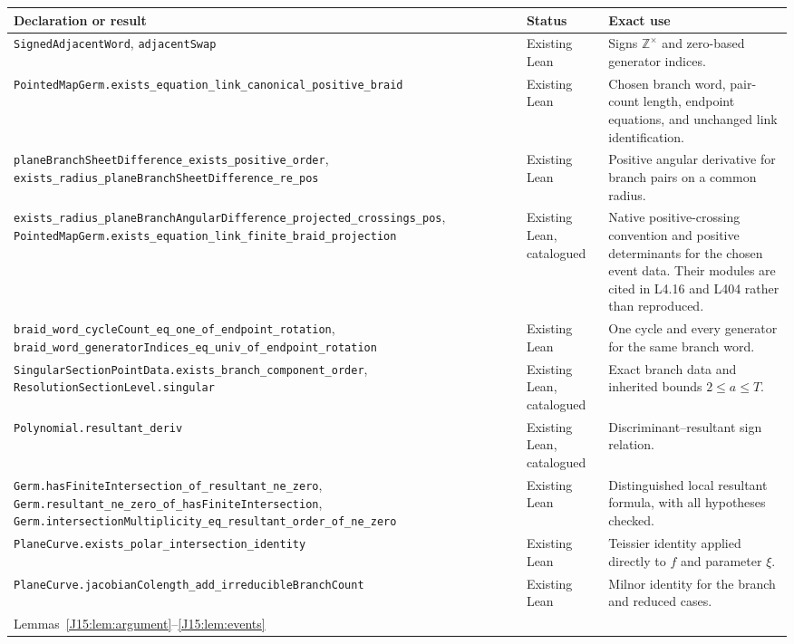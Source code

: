 \documentclass[11pt,oneside]{report}
\theoremstyle{definition}
\numberwithin{equation}{section}
\newcommand{\Z}{\mathbb Z}
\newcommand{\decl}[1]{\textnormal{\nolinkurl{#1}}}
\begin{document}
\small
\begin{longtable}{@{}>{\raggedright\arraybackslash}p{}>{\raggedright\arraybackslash}p{}>{\raggedright\arraybackslash}p{}@{}}
\toprule
Declaration or result & Status & Exact use\\
\midrule\endhead
\decl{SignedAdjacentWord}, \decl{adjacentSwap}
& Existing Lean & Signs $\Z^\times$ and zero-based generator indices.\\
\decl{PointedMapGerm.exists_equation_link_canonical_positive_braid}
& Existing Lean & Chosen branch word, pair-count length, endpoint equations, and unchanged link identification.\\
\decl{planeBranchSheetDifference_exists_positive_order},
\decl{exists_radius_planeBranchSheetDifference_re_pos}
& Existing Lean & Positive angular derivative for branch pairs on a common radius.\\
\decl{exists_radius_planeBranchAngularDifference_projected_crossings_pos},
\decl{PointedMapGerm.exists_equation_link_finite_braid_projection}
& Existing Lean, catalogued & Native positive-crossing convention and positive determinants for the chosen event data. Their modules are cited in L4.16 and L404 rather than reproduced.\\
\decl{braid_word_cycleCount_eq_one_of_endpoint_rotation},
\decl{braid_word_generatorIndices_eq_univ_of_endpoint_rotation}
& Existing Lean & One cycle and every generator for the same branch word.\\
\decl{SingularSectionPointData.exists_branch_component_order},
\decl{ResolutionSectionLevel.singular}
& Existing Lean, catalogued & Exact branch data and inherited bounds $2\le a\le T$.\\
\decl{Polynomial.resultant_deriv}
& Existing Lean, catalogued & Discriminant--resultant sign relation.\\
\decl{Germ.hasFiniteIntersection_of_resultant_ne_zero},
\decl{Germ.resultant_ne_zero_of_hasFiniteIntersection},
\decl{Germ.intersectionMultiplicity_eq_resultant_order_of_ne_zero}
& Existing Lean & Distinguished local resultant formula, with all hypotheses checked.\\
\decl{PlaneCurve.exists_polar_intersection_identity}
& Existing Lean & Teissier identity applied directly to $f$ and parameter $\xi$.\\
\decl{PlaneCurve.jacobianColength_add_irreducibleBranchCount}
& Existing Lean & Milnor identity for the branch and reduced cases.\\
Lemmas~\ref{J15:lem:argument}--\ref{J15:lem:events}

\end{longtable}
\end{document}
